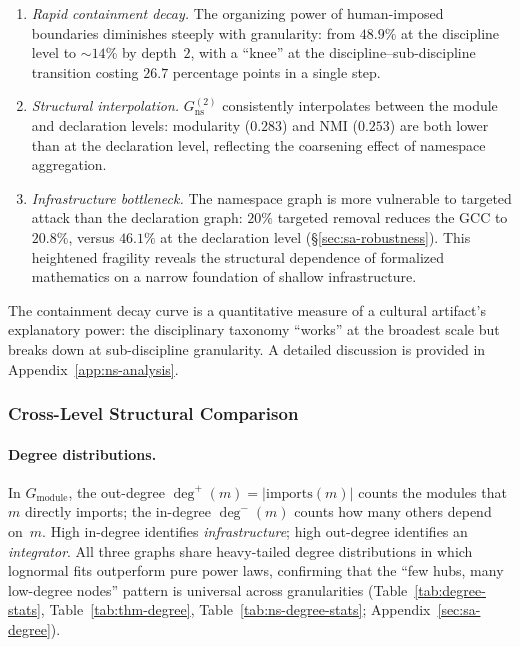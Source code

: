 \begin{enumerate}
    \item \textit{Rapid containment decay.} The organizing power of human-imposed boundaries diminishes steeply with granularity: from $48.9\%$ at the discipline level to ${\sim}14\%$ by depth~$2$, with a ``knee'' at the discipline--sub-discipline transition costing $26.7$ percentage points in a single step.

    \item \textit{Structural interpolation.} $G_{\mathrm{ns}}^{(2)}$ consistently interpolates between the module and declaration levels: modularity ($0.283$) and NMI ($0.253$) are both lower than at the declaration level, reflecting the coarsening effect of namespace aggregation.

    \item \textit{Infrastructure bottleneck.} The namespace graph is more vulnerable to targeted attack than the declaration graph: $20\%$ targeted removal reduces the GCC to $20.8\%$, versus $46.1\%$ at the declaration level (\S\ref{sec:sa-robustness}). This heightened fragility reveals the structural dependence of formalized mathematics on a narrow foundation of shallow infrastructure.
\end{enumerate}

\noindent
The containment decay curve is a quantitative measure of a cultural artifact's explanatory power: the disciplinary taxonomy ``works'' at the broadest scale but breaks down at sub-discipline granularity. A detailed discussion is provided in Appendix~\ref{app:ns-analysis}.

\subsubsection{Cross-Level Structural Comparison}

\paragraph{Degree distributions.}
In $G_{\mathrm{module}}$, the out-degree $\deg^{+}(m) = |\mathrm{imports}(m)|$ counts the modules that $m$ directly imports; the in-degree $\deg^{-}(m)$ counts how many others depend on~$m$. High in-degree identifies \emph{infrastructure}; high out-degree identifies an \emph{integrator}. All three graphs share heavy-tailed degree distributions in which lognormal fits outperform pure power laws, confirming that the ``few hubs, many low-degree nodes'' pattern is universal across granularities (Table~\ref{tab:degree-stats}, Table~\ref{tab:thm-degree}, Table~\ref{tab:ns-degree-stats}; Appendix~\ref{sec:sa-degree}).

